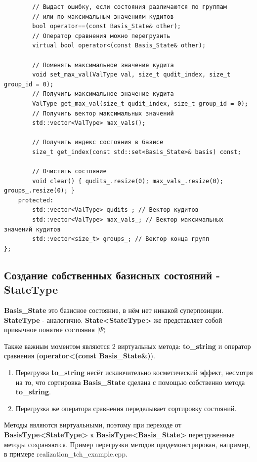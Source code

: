\documentclass[12pt,fleqn]{article}
\begin{document}
\begin{mdframed}[linecolor=black, topline=true, bottomline=true,
    leftline=false, rightline=false]
\begin{verbatim}
        // Выдаст ошибку, если состояния различаются по группам
        // или по максимальным значениям кудитов
        bool operator==(const Basis_State& other);
        // Оператор сравнения можно перегрузить
        virtual bool operator<(const Basis_State& other);
        
        // Поменять максимальное значение кудита
        void set_max_val(ValType val, size_t qudit_index, size_t group_id = 0);
        // Получить максимальное значение кудита
        ValType get_max_val(size_t qudit_index, size_t group_id = 0);
        // Получить вектор максимальных значений
        std::vector<ValType> max_vals();

        // Получить индекс состояния в базисе
        size_t get_index(const std::set<Basis_State>& basis) const;

        // Очистить состояние
        void clear() { qudits_.resize(0); max_vals_.resize(0); groups_.resize(0); }
    protected:
        std::vector<ValType> qudits_; // Вектор кудитов
        std::vector<ValType> max_vals_; // Вектор максимальных значений кудитов
        std::vector<size_t> groups_; // Вектор конца групп
};

\end{verbatim}
\end{mdframed}
        \subsection{Создание собственных базисных состояний - \textbf{StateType}}

        \textbf{Basis\_State} это базисное состояние, в нём нет никакой суперпозиции.
        \textbf{StateType} - аналогично. \textbf{State<StateType>} же представляет собой привычное понятие состояния $|\Psi\rangle$

        Также важным моментом являются 2 виртуальных метода: \textbf{to\_string} и оператор сравнения (\textbf{operator<(const Basis\_State\&)}).
        \begin{enumerate}
        \item{Перегрузка \textbf{to\_string} несёт исключительно косметический эффект, несмотря на то, что сортировка \textbf{Basis\_State} сделана с помощью собственно метода \textbf{to\_string}.}
        \item{Перегрузка же оператора сравнения переделывает сортировку состояний.}
        \end{enumerate}

        Методы являются виртуальными, поэтому при переходе от \textbf{BasisType<StateType>} к \textbf{BasisType<Basis\_State>} перегруженные методы сохраняются.
        Пример перегрузки методов продемонстрирован, например, в примере \textsf{realization\_tch\_example.cpp}.
\end{document}
